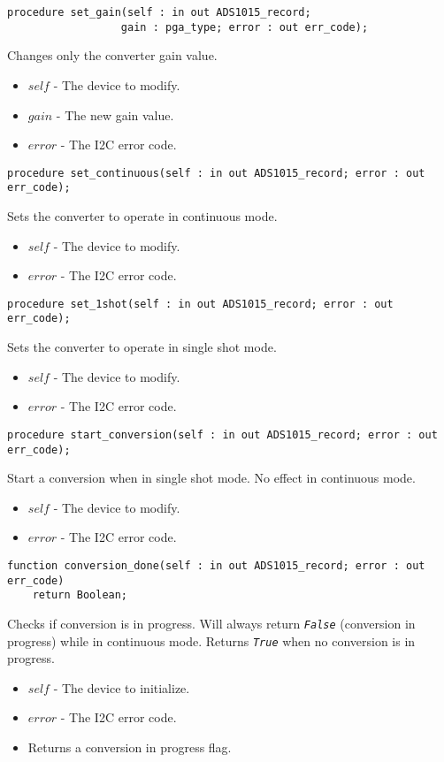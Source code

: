 \documentclass[10pt, openany]{book}
\newcommand{\constant}[1]{\emph{\texttt{#1}}}
\begin{document}
\begin{lstlisting}
procedure set_gain(self : in out ADS1015_record;
                  gain : pga_type; error : out err_code);
\end{lstlisting}
Changes only the converter gain value.
\begin{itemize}
  \item $self$ - The device to modify.
  \item $gain$ - The new gain value.
  \item $error$ - The I2C error code.
\end{itemize}

\begin{lstlisting}
procedure set_continuous(self : in out ADS1015_record; error : out err_code);
\end{lstlisting}
Sets the converter to operate in continuous mode.
\begin{itemize}
  \item $self$ - The device to modify.
  \item $error$ - The I2C error code.
\end{itemize}
\begin{lstlisting}
procedure set_1shot(self : in out ADS1015_record; error : out err_code);
\end{lstlisting}
Sets the converter to operate in single shot mode.
\begin{itemize}
  \item $self$ - The device to modify.
  \item $error$ - The I2C error code.
\end{itemize}

\begin{lstlisting}
procedure start_conversion(self : in out ADS1015_record; error : out err_code);
\end{lstlisting}
Start a conversion when in single shot mode.  No effect in continuous mode.
\begin{itemize}
  \item $self$ - The device to modify.
  \item $error$ - The I2C error code.
\end{itemize}

\begin{lstlisting}
function conversion_done(self : in out ADS1015_record; error : out err_code)
    return Boolean;
\end{lstlisting}
Checks if conversion is in progress.  Will always return \constant{False} (conversion in progress) while in continuous mode.  Returns \constant{True} when no conversion is in progress.
\begin{itemize}
  \item $self$ - The device to initialize.
  \item $error$ - The I2C error code.
  \item Returns a conversion in progress flag.
\end{itemize}
\end{document}
